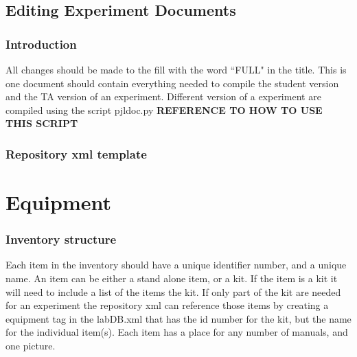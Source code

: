 \documentclass[justified]{book}
\begin{document}
\section{Editing Experiment Documents}\label{sec:EquipEdit}

\subsection{Introduction}

All changes should be made to the fill with the word ``FULL" in the title. This is one document should contain everything needed to compile the student version and the TA version of an experiment. Different version of a experiment are compiled using the script pjldoc.py {\bf REFERENCE TO HOW TO USE THIS SCRIPT}



\subsection{Repository xml template}






\chapter{Equipment}

\subsection{Inventory structure}

Each item in the inventory should have a unique identifier number, and a unique name. An item can be either a stand alone item, or a kit. If the item is a kit it will need to include a list of the items the kit. If only part of the kit are needed for an experiment the repository xml can reference those items by creating a equipment tag in the labDB.xml that has the id number for the kit, but the name for the individual item(s). Each item has a place for any number of manuals, and one picture.\\

\end{document}
